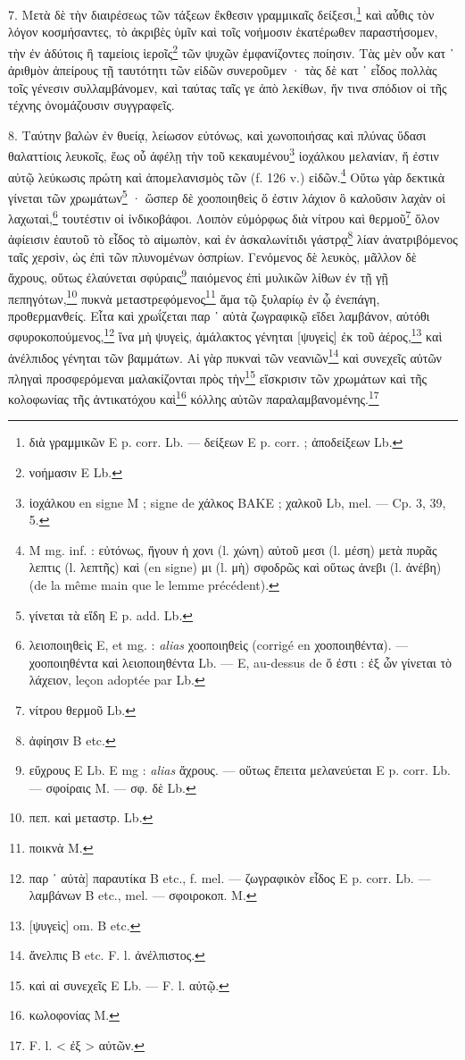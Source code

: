 \documentclass[a4paper, 11pt, oneside, polutonikogreek, french]{article}
\begin{document}
7. Μετὰ δὲ τὴν διαιρέσεως τῶν τάξεων ἔκθεσιν γραμμικαῖς δείξεσι,\footnote{διὰ γραμμικῶν E p. corr. Lb. --- δείξεων E p. corr. ; ἀποδείξεων Lb.} καὶ αὖθις τὸν λόγον κοσμήσαντες, τὸ ἀκριβὲς ὑμῖν καὶ τοῖς νοήμοσιν ἑκατέρωθεν παραστήσομεν, τὴν ἐν ἀδύτοις ἢ ταμείοις ἱεροῖς\footnote{νοήμασιν E Lb.} τῶν ψυχῶν ἐμφανίζοντες ποίησιν. Τὰς μὲν οὖν κατ ᾽ ἀριθμὸν ἀπείρους τῇ ταυτότητι τῶν εἰδῶν συνεροῦμεν · τὰς δὲ κατ ᾽ εἶδος πολλὰς τοῖς γένεσιν συλλαμβάνομεν, καὶ ταύτας ταῖς γε ἀπὸ λεκίθων, ἥν τινα σπόδιον οἱ τῆς τέχνης ὀνομάζουσιν συγγραφεῖς.

8. Ταύτην βαλὼν ἐν θυείᾳ, λείωσον εὐτόνως, καὶ χωνοποιήσας καὶ πλύνας ὕδασι θαλαττίοις λευκοῖς, ἕως οὗ ἀφέλῃ τὴν τοῦ κεκαυμένου\footnote{ἰοχάλκου en signe M ; signe de χάλκος BAKE ; χαλκοῦ Lb, mel. --- Cp. 3, 39, 5.} ἰοχάλκου μελανίαν, ἥ ἐστιν αὐτῷ λεύκωσις πρώτη καὶ ἀπομελανισμὸς τῶν (f. 126 v.) εἰδῶν.\footnote{M mg. inf. : εὐτόνως, ἤγουν ἡ χονι (l. χώνη) αὐτοῦ μεσι (l. μέση) μετὰ πυρᾶς λεπτις (l. λεπτῆς) καὶ (en signe) μι (l. μὴ) σφοδρῶς καὶ οὕτως ἀνεβι (l. ἀνέβη) (de la même main que le lemme précédent).} Οὕτω γὰρ δεκτικὰ γίνεται τῶν χρωμάτων\footnote{γίνεται τὰ εἴδη E p. add. Lb.} · ὥσπερ δὲ χοοποιηθεὶς ὅ ἐστιν λάχιον ὃ καλοῦσιν λαχὰν οἱ λαχωταὶ,\footnote{λειοποιηθεὶς E, et mg. : \emph{alias} χοοποιηθεὶς (corrigé en χοοποιηθέντα). --- χοοποιηθέντα καὶ λειοποιηθέντα Lb. --- E, au-dessus de ὅ ἐστι : ἐξ ὧν γίνεται τὸ λάχειον, leçon adoptée par Lb.} τουτέστιν οἱ ἰνδικοβάφοι. Λοιπὸν εὐμόρφως διὰ νίτρου καὶ θερμοῦ\footnote{νίτρου θερμοῦ Lb.} ὅλον ἀφίεισιν ἑαυτοῦ τὸ εἶδος τὸ αἱμωπὸν, καὶ ἐν ἀσκαλωνίτιδι γάστρᾳ\footnote{ἀφίησιν B etc.} λίαν ἀνατριβόμενος ταῖς χερσὶν, ὡς ἐπὶ τῶν πλυνομένων ὀσπρίων. Γενόμενος δὲ λευκὸς, μᾶλλον δὲ ἄχρους, οὕτως ἐλαύνεται σφύραις\footnote{εὕχρους E Lb. E mg : \emph{alias} ἄχρους. --- οὕτως ἔπειτα μελανεύεται E p. corr. Lb. --- σφοίραις M. --- σφ. δὲ Lb.} παιόμενος ἐπὶ μυλικῶν λίθων ἐν τῇ γῇ πεπηγότων,\footnote{πεπ. καὶ μεταστρ. Lb.} πυκνὰ μεταστρεφόμενος\footnote{ποικνὰ M.} ἅμα τῷ ξυλαρίῳ ἐν ᾧ ἐνεπάγη, προθερμανθείς. Εἶτα καὶ χρωΐζεται παρ ᾽ αὐτὰ ζωγραφικῷ εἴδει λαμβάνον, αὐτόθι σφυροκοπούμενος,\footnote{παρ ᾽ αὐτὰ] παραυτίκα B etc., f. mel. --- ζωγραφικὸν εἶδος E p. corr. Lb. --- λαμβάνων B etc., mel. --- σφοιροκοπ. M.} ἵνα μὴ ψυγεὶς, ἀμάλακτος γένηται [ψυγεὶς] ἐκ τοῦ ἀέρος,\footnote{[ψυγεὶς] om. B etc.} καὶ ἀνέλπιδος γένηται τῶν βαμμάτων. Αἱ γὰρ πυκναὶ τῶν νεανιῶν\footnote{ἄνελπις B etc. F. l. ἀνέλπιστος.} καὶ συνεχεῖς αὐτῶν πληγαὶ προσφερόμεναι μαλακίζονται πρὸς τὴν\footnote{καὶ αἱ συνεχεῖς E Lb. --- F. l. αὐτῷ.} εἴσκρισιν τῶν χρωμάτων καὶ τῆς κολοφωνίας τῆς ἀντικατόχου καὶ\footnote{κωλοφονίας M.} κόλλης αὐτῶν παραλαμβανομένης.\footnote{F. l. < ἐξ > αὐτῶν.}
\end{document}
